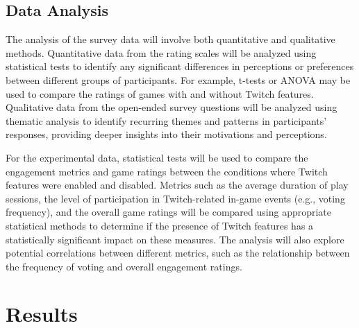\documentclass[conference]{IEEEtran}
\begin{document}
\subsection{Data Analysis}
The analysis of the survey data will involve both quantitative and qualitative methods. Quantitative data from the rating scales will be analyzed using statistical tests to identify any significant differences in perceptions or preferences between different groups of participants. For example, t-tests or ANOVA may be used to compare the ratings of games with and without Twitch features. Qualitative data from the open-ended survey questions will be analyzed using thematic analysis to identify recurring themes and patterns in participants' responses, providing deeper insights into their motivations and perceptions.

For the experimental data, statistical tests will be used to compare the engagement metrics and game ratings between the conditions where Twitch features were enabled and disabled. Metrics such as the average duration of play sessions, the level of participation in Twitch-related in-game events (e.g., voting frequency), and the overall game ratings will be compared using appropriate statistical methods to determine if the presence of Twitch features has a statistically significant impact on these measures. The analysis will also explore potential correlations between different metrics, such as the relationship between the frequency of voting and overall engagement ratings.

\section{Results}\label{sec:results}
\end{document}
